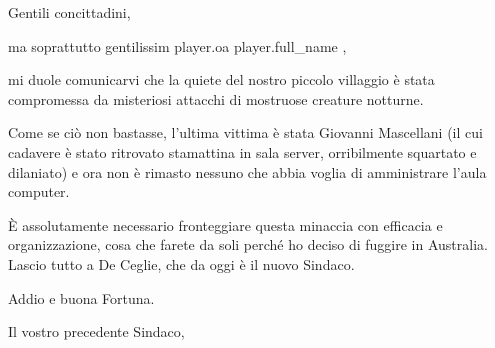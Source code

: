 \documentclass{letter}
\date{16 marzo 2014}
\begin{document}
\begin{letter}{}
\opening{Gentili concittadini,}

ma soprattutto gentilissim{{ player.oa }} {{ player.full_name }},

mi duole comunicarvi che la quiete del nostro piccolo villaggio è stata compromessa da misteriosi attacchi di mostruose creature notturne.

Come se ciò non bastasse, l'ultima vittima è stata Giovanni Mascellani (il cui cadavere è stato ritrovato stamattina in sala server, orribilmente squartato e dilaniato) e ora non è rimasto nessuno che abbia voglia di amministrare l'aula computer.

È assolutamente necessario fronteggiare questa minaccia con efficacia e organizzazione, cosa che farete da soli perché ho deciso di fuggire in Australia.
Lascio tutto a De Ceglie, che da oggi è il nuovo Sindaco.

Addio e buona Fortuna.

\closing{Il vostro precedente Sindaco,}

\end{letter}
\end{document}
